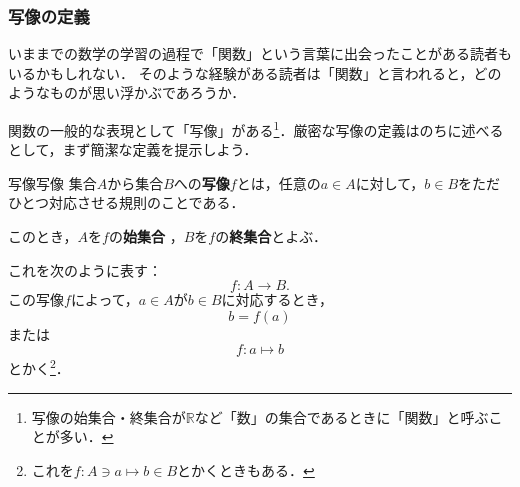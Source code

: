 \documentclass[a4paper,11pt]{ltjsarticle}
\renewcommand{\emph}[1]{\textbf{#1}}
\begin{document}
        \subsubsection{写像の定義}

        いままでの数学の学習の過程で「関数」という言葉に出会ったことがある読者もいるかもしれない．
        そのような経験がある読者は「関数」と言われると，どのようなものが思い浮かぶであろうか．

        関数の一般的な表現として「写像」がある\footnote{写像の始集合・終集合が$\mathbb{R}$など「数」の集合であるときに「関数」と呼ぶことが多い．}．厳密な写像の定義はのちに述べるとして，まず簡潔な定義を提示しよう．

        \begin{definition}{写像}{写像}
          集合$A$から集合$B$への\emph{写像}$f$とは，任意の$a \in A$に対して，$b \in B$をただひとつ対応させる規則のことである．

          このとき，$A$を$f$の\emph{始集合} ，$B$を$f$の\emph{終集合}とよぶ．

          これを次のように表す：
          \[
          f \colon A \to B.
          \]
          この写像$f$によって，$a \in A$が$b \in B$に対応するとき，
          \[
          b=f(a) 
          \] 
          または
          \[
          f \colon a \mapsto b
          \]
          とかく\footnote{これを$ f \colon A \ni a \mapsto b \in B$とかくときもある．}．
        \end{definition}
\end{document}
